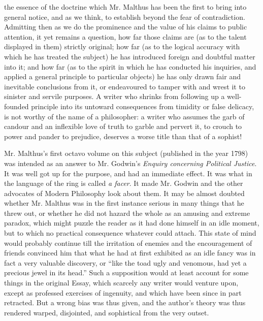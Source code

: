 the essence of the doctrine which Mr. Malthus has been the first
to bring into general notice, and as we think, to establish beyond
the fear of contradiction. Admitting then as we do the prominence
and the value of his claims to public attention, it yet remains a
question, how far those claims are (as to the talent displayed in
them) strictly original; how far (as to the logical accuracy with
which he has treated the subject) he has introduced foreign and
doubtful matter into it; and how far (as to the spirit in which he
has conducted his inquiries, and applied a general principle to
particular objects) he has only drawn fair and inevitable
conclusions from it, or endeavoured to tamper with and wrest it to
sinister and servile purposes. A writer who shrinks from following
up a well-founded principle into its untoward consequences from
timidity or false delicacy, is not worthy of the name of a
philosopher: a writer who assumes the garb of candour and an
inflexible love of truth to garble and pervert it, to crouch to
power and pander to prejudice, deserves a worse title than that of
a sophist!

Mr. Malthus's first octavo volume on this subject (published in
the year 1798) was intended as an answer to Mr. Godwin's
\emph{Enquiry concerning Political Justice}. It was well got up
for the purpose, and had an immediate effect. It was what in the
language of the ring is called \emph{a facer}. It made Mr. Godwin
and the other advocates of Modern Philosophy look about them. It
may be almost doubted whether Mr. Malthus was in the first
instance serious in many things that he threw out, or whether he
did not hazard the whole as an amusing and extreme paradox, which
might puzzle the reader as it had done himself in an idle moment,
but to which no practical consequence whatever could attach. This
state of mind would probably continue till the irritation of
enemies and the encouragement of friends convinced him that what
he had at first exhibited as an idle fancy was in fact a very
valuable discovery, or ``like the toad ugly and venomous, had yet
a precious jewel in its head.'' Such a supposition would at least
account for some things in the original Essay, which scarcely any
writer would venture upon, except as professed exercises of
ingenuity, and which have been since in part retracted. But a
wrong bias was thus given, and the author's theory was thus
rendered warped, disjointed, and sophistical from the very outset.

